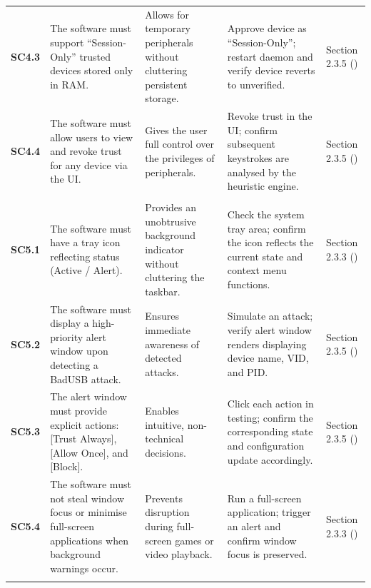 {\begin{xltabular}{\textwidth}{@{} l P{3.0cm} L L P{2.2cm} @{}}
			\textbf{SC4.3} &
			The software must support ``Session-Only'' trusted devices stored only in RAM. &
			Allows for temporary peripherals without cluttering persistent storage. &
			Approve device as ``Session-Only''; restart daemon and verify device reverts to unverified. &
			Section 2.3.5 (\stakeholdersTU) \\

			\textbf{SC4.4} &
			The software must allow users to view and revoke trust for any device via the UI. &
			Gives the user full control over the privileges of peripherals. &
			Revoke trust in the UI; confirm subsequent keystrokes are analysed by the heuristic engine. &
			Section 2.3.5 (\stakeholdersTU) \\
			\addlinespace[0.8em]

			 \\
			\midrule

			\textbf{SC5.1} &
			The software must have a tray icon reflecting status (Active / Alert). &
			Provides an unobtrusive background indicator without cluttering the taskbar. &
			Check the system tray area; confirm the icon reflects the current state and context menu functions. &
			Section 2.3.3 (\stakeholdersPU) \\

			\textbf{SC5.2} &
			The software must display a high-priority alert window upon detecting a BadUSB attack. &
			Ensures immediate awareness of detected attacks. &
			Simulate an attack; verify alert window renders displaying device name, VID, and PID. &
			Section 2.3.5 (\stakeholdersSU) \\

			\textbf{SC5.3} &
			The alert window must provide explicit actions: [Trust Always], [Allow Once], and [Block]. &
			Enables intuitive, non-technical decisions. &
			Click each action in testing; confirm the corresponding state and configuration update accordingly. &
			Section 2.3.5 (\stakeholdersSU) \\

			\textbf{SC5.4} &
			The software must not steal window focus or minimise full-screen applications when background warnings occur. &
			Prevents disruption during full-screen games or video playback. &
			Run a full-screen application; trigger an alert and confirm window focus is preserved. &
			Section 2.3.3 (\stakeholdersPU) \\
			\addlinespace[0.8em]

			 \\
			\midrule


\end{xltabular}}
